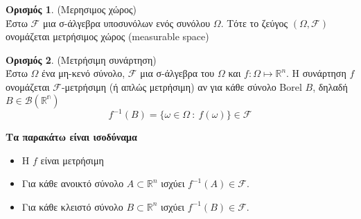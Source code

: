 \documentclass[12pt,a4paper]{article}
\theoremstyle{definition}
\numberwithin{equation}{section}
\newtheorem{orismos}{Ορισμός}
\begin{document}
\begin{orismos}{(Μερησιμος χώρος)}\\
Έστω $\mathcal{F}$ μια σ-άλγεβρα υποσυνόλων ενός συνόλου $\Omega$. Τότε το ζεύγος $(\Omega,\mathcal{F})$ ονομάζεται
μετρήσιμος χώρος (\textlatin{measurable space)}
\end{orismos}

\begin{orismos}{(Μετρήσιμη συνάρτηση)}\\
Έστω $\Omega$ ένα μη-κενό σύνολο, $\mathcal{F}$ μια σ-άλγεβρα του $\Omega$ και $f:\Omega \mapsto \mathbb{R}^n$. Η συνάρτηση
$f$ ονομάζεται $\mathcal{F}$-μετρήσιμη (ή απλώς μετρήσιμη) αν για κάθε σύνολο \textlatin{Borel} $B$, δηλαδή $B\in\mathcal{B}(\mathbb{R^n})$
$$ f^{-1}(B) = \{ \omega \in \Omega \: : \: f(\omega) \} \in \mathcal{F}$$
\end{orismos}

\textbf{\textbf{Τα παρακάτω είναι ισοδύναμα}}
\begin{itemize}
\item Η \(f\) είναι μετρήσιμη
\item Για κάθε ανοικτό σύνολο \(A\subset \mathbb{R}^n\) ισχύει \(f^{-1}(A) \in \mathcal{F}\).
\item Για κάθε κλειστό σύνολο \(B\subset \mathbb{R}^n\) ισχύει \(f^{-1}(B) \in \mathcal{F}\).
\end{itemize}
\end{document}
